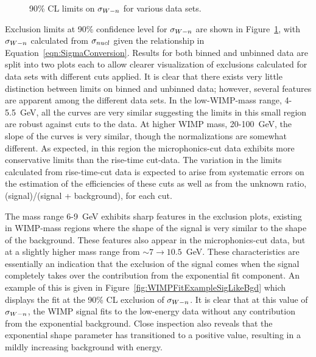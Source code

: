 			\begin{sidewaysfigure}
				\centering
				\caption[90\% CL limits on $\sigman$ for various data sets]
				{90\% CL limits on $\sigman$ for various data sets.}
				\label{fig:UnconstrainedLimits}
			\end{sidewaysfigure}				
Exclusion limits at 90\% confidence level for $\sigman$ are shown in Figure~\ref{fig:UnconstrainedLimits}, with $\sigman$ calculated from $\sigma_{nucl}$ given the relationship in Equation~\ref{eqn:SigmaConversion}.  Results for both binned and unbinned data are split into two plots each to allow clearer visualization of exclusions calculated for data sets with different cuts applied.  
It is clear that there exists very little distinction between limits on binned and unbinned data; however, several features are apparent among the different data sets.  In the low-WIMP-mass range, 4-5.5~GeV, all the curves are very similar suggesting the limits in this small region are robust against cuts to the data.  At higher WIMP mass, 20-100~GeV, the slope of the curves is very similar, though the normalizations are somewhat different.  As expected, in this region the microphonics-cut data exhibits more conservative limits than the rise-time cut-data.  The variation in the limits calculated from rise-time-cut data is expected to arise from systematic errors on the estimation of the efficiencies of these cuts as well as from the unknown ratio, (signal)/(signal + background), for each cut.  

The mass range 6-9~GeV exhibits sharp features in the exclusion plots, existing in WIMP-mass regions where the shape of the signal is very similar to the shape of the background.  These features also appear in the microphonics-cut data, but at a slightly higher mass range from $\sim7\to10.5$~GeV.  These characteristics are essentially an indication that the exclusion of the signal comes when the signal completely takes over the contribution from the exponential fit component.  An example of this is given in Figure~\ref{fig:WIMPFitExampleSigLikeBgd} which displays the fit at the 90\% CL exclusion of $\sigman$.  It is clear that at this value of $\sigman$, the WIMP signal fits to the low-energy data without any contribution from the exponential background.  Close inspection also reveals that the exponential shape parameter has transitioned to a positive value, resulting in a mildly increasing background with energy.  

